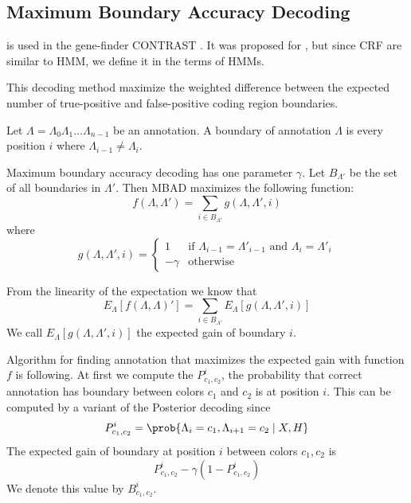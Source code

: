 \subsection{Maximum Boundary Accuracy Decoding}

 is used in the gene-finder
CONTRAST \cite{Gross2007}. It
was proposed for , but since CRF
are similar to HMM, we define it in the terms of HMMs.

This decoding method  maximize the weighted difference between the expected
number of true-positive and false-positive coding region boundaries.

\begin{definition}
Let $\Lambda=\Lambda_0\Lambda_1\dots\Lambda_{n-1}$ be an annotation. A boundary of
annotation $\Lambda$ is every position $i$ where $\Lambda_{i-1}\not=\Lambda_i$. 
\end{definition}

Maximum boundary accuracy decoding has one parameter $\gamma$. Let $B_{\Lambda'}$ be the
set of all boundaries in $\Lambda'$. Then MBAD maximizes the following function:
\begin{equation}
f(\Lambda,\Lambda')=\sum_{i\in B_{\Lambda'}}g(\Lambda,\Lambda',i)
\end{equation}
where 
\begin{equation}
g(\Lambda,\Lambda',i)=
\begin{cases}
1 & \text{if $\Lambda_{i-1}=\Lambda'_{i-1}$ and $\Lambda_{i}=\Lambda'_{i}$}\\
-\gamma& \text{otherwise}
\end{cases}
\end{equation}

From the linearity of the expectation we know that
\[E_{\Lambda}[f(\Lambda,\Lambda)']=\sum_{i\in
B_{\Lambda'}}E_{\Lambda}[g(\Lambda,\Lambda',i)]\] We call
$E_{\Lambda}[g(\Lambda,\Lambda',i)]$ the expected gain of boundary $i$.


Algorithm for finding annotation that maximizes the expected gain with function $f$
is following. At first we compute the $P^i_{c_1,c_2}$, the probability that correct annotation
has boundary between colors $c_1$ and $c_2$ is at position $i$. This can be
computed by a variant of the Posterior decoding
since 
\[P_{c_1,c_2}^i=\prob{\Lambda_i=c_1,\Lambda_{i+1}=c_2\mid X,H}\]  
  The expected gain of
boundary at position $i$ between colors $c_1,c_2$  is 
\[P^i_{c_1,c_2}-\gamma (1-P^i_{c_1,c_2})\]
We denote this value by  $B^i_{c_1,c_2}$.

